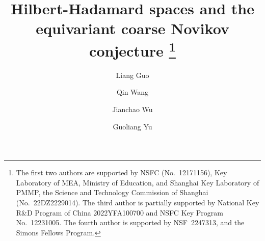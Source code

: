 \documentclass[11pt]{article}
\theoremstyle{definition}
\theoremstyle{plain}
\begin{document}
\title{Hilbert-Hadamard spaces and the equivariant coarse Novikov conjecture
\thanks{
The first two authors are supported by NSFC (No.~12171156), Key Laboratory of MEA, Ministry of Education, and Shanghai Key Laboratory of PMMP, the Science and Technology Commission of Shanghai (No.~22DZ2229014).
The third author is partially supported by
National Key R\&D Program of China 2022YFA100700 and 
NSFC Key Program No.~12231005. 
The fourth author is supported by NSF~2247313, and the Simons Fellows Program. 
}}

\author[a]{Liang Guo}
\author[b]{Qin Wang}
\author[c]{Jianchao Wu}
\author[d]{Guoliang Yu}





\maketitle
\end{document}
